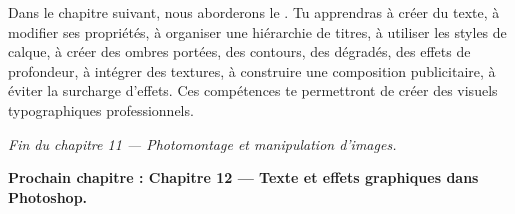 Dans le chapitre suivant, nous aborderons le . Tu apprendras à créer du texte, à modifier ses propriétés, à organiser une hiérarchie de titres, à utiliser les styles de calque, à créer des ombres portées, des contours, des dégradés, des effets de profondeur, à intégrer des textures, à construire une composition publicitaire, à éviter la surcharge d'effets. Ces compétences te permettront de créer des visuels typographiques professionnels.

\vspace{2em}

\begin{center}
\textit{Fin du chapitre 11 --- Photomontage et manipulation d'images.}

\vspace{1em}

\textbf{Prochain chapitre : Chapitre 12 --- Texte et effets graphiques dans Photoshop.}
\end{center}